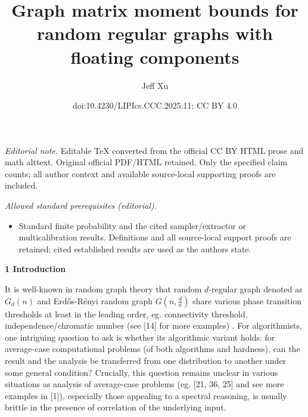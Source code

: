 \documentclass[10pt,a4paper]{article}
\title{Graph matrix moment bounds for random regular graphs with floating components}
\author{Jeff Xu}
\date{doi:10.4230/LIPIcs.CCC.2025.11; CC BY 4.0}
\begin{document}
\maketitle
\noindent\textit{Editorial note.} Editable TeX converted from the official CC BY HTML prose and math alttext. Original official PDF/HTML retained. Only the specified claim counts; all author context and available source-local supporting proofs are included.\par\medskip
\noindent\textit{Allowed standard prerequisites (editorial).}\begin{itemize}
\item Standard finite probability and the cited sampler/extractor or multicalibration results. Definitions and all source-local support proofs are retained; cited established results are used as the authors state.
\end{itemize}\medskip


\par\medskip\noindent\textbf{
1 Introduction}\par




It is well-known in random graph theory that random $d$-regular graph denoted as $G_{d}(n)$ and Erdős-Rényi random graph $G(n,\frac{d}{n})$ share various phase transition thresholds at least in the leading order, eg. connectivity threshold, independence/chromatic number (see [14] for more examples) . For algorithmists,
one intriguing question to ask is whether its algorithmic variant holds: for average-case computational problems (of both algorithms and hardness),
can the result and the analysis be transferred from one distribution to another under some general condition?
Crucially, this question remains unclear in various situations as analysis of average-case problems (eg. [21, 36, 25] and see more examples in [1]), especially those appealing to a spectral reasoning, is usually brittle in the presence of correlation of the underlying input.\par
\end{document}
